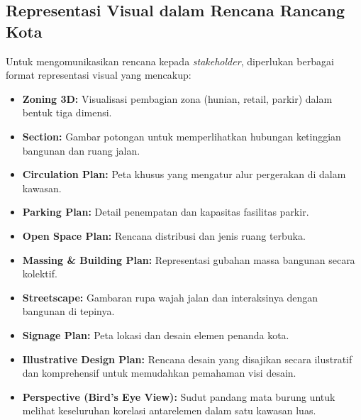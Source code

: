 \documentclass[../rumukota.tex]{subfiles}
\begin{document}
\subsection{Representasi Visual dalam Rencana Rancang Kota}
Untuk mengomunikasikan rencana kepada \textit{stakeholder}, diperlukan berbagai format representasi visual yang mencakup:
\begin{itemize}
	\item \textbf{Zoning 3D:} Visualisasi pembagian zona (hunian, retail, parkir) dalam bentuk tiga dimensi.
	\item \textbf{Section:} Gambar potongan untuk memperlihatkan hubungan ketinggian bangunan dan ruang jalan.
	\item \textbf{Circulation Plan:} Peta khusus yang mengatur alur pergerakan di dalam kawasan.
	\item \textbf{Parking Plan:} Detail penempatan dan kapasitas fasilitas parkir.
	\item \textbf{Open Space Plan:} Rencana distribusi dan jenis ruang terbuka.
	\item \textbf{Massing \& Building Plan:} Representasi gubahan massa bangunan secara kolektif.
	\item \textbf{Streetscape:} Gambaran rupa wajah jalan dan interaksinya dengan bangunan di tepinya.
	\item \textbf{Signage Plan:} Peta lokasi dan desain elemen penanda kota.
	\item \textbf{Illustrative Design Plan:} Rencana desain yang disajikan secara ilustratif dan komprehensif untuk memudahkan pemahaman visi desain.
	\item \textbf{Perspective (Bird's Eye View):} Sudut pandang mata burung untuk melihat keseluruhan korelasi antarelemen dalam satu kawasan luas.
\end{itemize}


\end{document}
